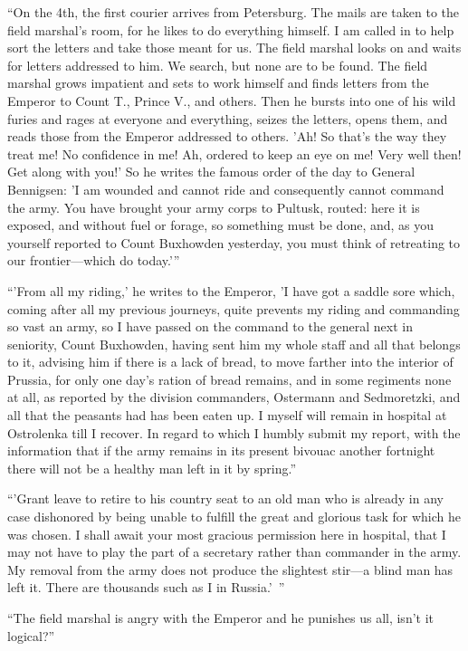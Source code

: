 ``On the 4th, the first courier arrives from Petersburg. The
mails are taken to the field marshal's room, for he likes to do
everything himself. I am called in to help sort the letters and
take those meant for us. The field marshal looks on and waits for
letters addressed to him. We search, but none are to be
found. The field marshal grows impatient and sets to work himself
and finds letters from the Emperor to Count T., Prince V., and
others. Then he bursts into one of his wild furies and rages at
everyone and everything, seizes the letters, opens them, and
reads those from the Emperor addressed to others. 'Ah! So that's
the way they treat me! No confidence in me! Ah, ordered to keep
an eye on me! Very well then! Get along with you!' So he writes
the famous order of the day to General Bennigsen: 'I am wounded
and cannot ride and consequently cannot command the army.  You
have brought your army corps to Pultusk, routed: here it is
exposed, and without fuel or forage, so something must be done,
and, as you yourself reported to Count Buxhowden yesterday, you
must think of retreating to our frontier---which do today.'{}''

``'From all my riding,' he writes to the Emperor, 'I have got a
saddle sore which, coming after all my previous journeys, quite
prevents my riding and commanding so vast an army, so I have
passed on the command to the general next in seniority, Count
Buxhowden, having sent him my whole staff and all that belongs to
it, advising him if there is a lack of bread, to move farther
into the interior of Prussia, for only one day's ration of bread
remains, and in some regiments none at all, as reported by the
division commanders, Ostermann and Sedmoretzki, and all that the
peasants had has been eaten up. I myself will remain in hospital
at Ostrolenka till I recover. In regard to which I humbly submit
my report, with the information that if the army remains in its
present bivouac another fortnight there will not be a healthy man
left in it by spring.''

``'Grant leave to retire to his country seat to an old man who is
already in any case dishonored by being unable to fulfill the
great and glorious task for which he was chosen. I shall await
your most gracious permission here in hospital, that I may not
have to play the part of a secretary rather than commander in the
army. My removal from the army does not produce the slightest
stir---a blind man has left it. There are thousands such as I in
Russia.'\ ''

``The field marshal is angry with the Emperor and he punishes us
all, isn't it logical?''

